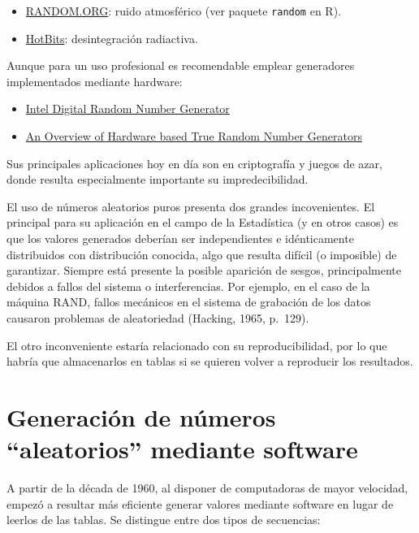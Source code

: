 \documentclass[
]{book}
\theoremstyle{break}
\theoremstyle{definition}
\theoremstyle{definition}
\theoremstyle{definition}
\theoremstyle{definition}
\theoremstyle{remark}
\begin{document}
\begin{itemize}
\item
  \href{http://www.random.org/integers}{RANDOM.ORG}: ruido atmosférico
  (ver paquete \texttt{random} en R).
\item
  \href{http://www.fourmilab.ch/hotbits}{HotBits}: desintegración radiactiva.
\end{itemize}

Aunque para un uso profesional es recomendable emplear generadores implementados mediante hardware:

\begin{itemize}
\item
  \href{http://software.intel.com/en-us/articles/intel-digital-random-number-generator-drng-software-implementation-guide}{Intel Digital Random Number Generator}
\item
  \href{https://rbridge.inlab.net/manual/trngs}{An Overview of Hardware based True Random Number Generators}
\end{itemize}

Sus principales aplicaciones hoy en día son en criptografía y juegos de azar, donde resulta especialmente importante su impredecibilidad.

El uso de números aleatorios puros presenta dos grandes incovenientes.
El principal para su aplicación en el campo de la Estadística (y en otros casos) es que los valores generados deberían ser independientes e idénticamente distribuidos con distribución conocida, algo que resulta difícil (o imposible) de garantizar.
Siempre está presente la posible aparición de sesgos, principalmente debidos a fallos del sistema o interferencias.
Por ejemplo, en el caso de la máquina RAND, fallos mecánicos en el sistema de grabación de los datos causaron problemas de aleatoriedad (Hacking, 1965, p.~129).

El otro inconveniente estaría relacionado con su reproducibilidad, por lo que habría que almacenarlos en tablas si se quieren volver a reproducir los resultados.

\hypertarget{generaciuxf3n-de-nuxfameros-aleatorios-mediante-software}{%
\section{Generación de números ``aleatorios'' mediante software}\label{generaciuxf3n-de-nuxfameros-aleatorios-mediante-software}}

A partir de la década de 1960, al disponer de computadoras de mayor velocidad, empezó a resultar más eficiente generar valores mediante software en lugar de leerlos de las tablas.
Se distingue entre dos tipos de secuencias:
\end{document}

